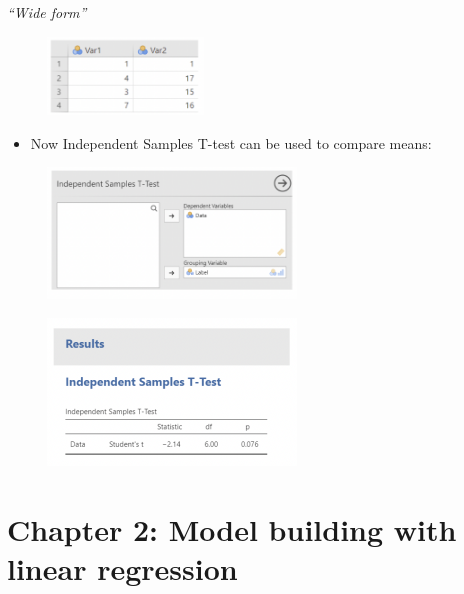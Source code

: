 \documentclass[
  letterpaper,
  DIV=11,
  numbers=noendperiod]{scrreprt}
\providecommand{\tightlist}{%
  \setlength{\itemsep}{0pt}\setlength{\parskip}{0pt}}\usepackage{longtable,booktabs,array}
\begin{document}
\emph{``Wide form''}

\begin{figure}

\includegraphics[width=1.63542in,height=\textheight]{images/mod1_26.png} \hfill{}

\end{figure}

\begin{itemize}
\tightlist
\item
  Now Independent Samples T-test can be used to compare means:
\end{itemize}

\begin{figure}

\includegraphics[width=2.60417in,height=\textheight]{images/mod1_27.png} \hfill{}

\end{figure}

\begin{figure}

\hfill{} \includegraphics[width=2.60417in,height=\textheight]{images/mod1_28.png}

\end{figure}


\hypertarget{chapter-2-model-building-with-linear-regression}{%
\chapter{Chapter 2: Model building with linear
regression}\label{chapter-2-model-building-with-linear-regression}}
\end{document}

